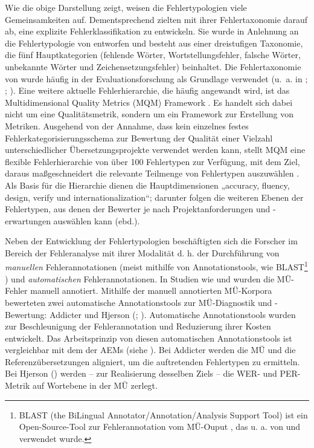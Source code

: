 Wie die obige Darstellung zeigt, weisen die Fehlertypologien viele Gemeinsamkeiten auf. Dementsprechend zielten \citet{VilarEtAl2006} mit ihrer Fehlertaxonomie darauf ab, eine explizite Fehlerklassifikation zu entwickeln. Sie wurde in Anlehnung an die Fehlertypologie von \citet{LlitjósEtAl2005} entworfen und besteht aus einer dreistufigen Taxonomie, die fünf Hauptkategorien (fehlende Wörter, Wortstellungsfehler, falsche Wörter, unbekannte Wörter und Zeichensetzungsfehler) beinhaltet. Die Fehlertaxonomie von \citet{VilarEtAl2006} wurde häufig in der Evaluationsforschung als Grundlage verwendet (u.~a. in \citealt{AvramidisKöhn2008}; \citealt{Bojar2011}; \citealt{PopovićBurchardt2011}). Eine weitere aktuelle Fehlerhierarchie, die häufig angewandt wird, ist das Multidimensional Quality Metrics (MQM) Framework \citep{LommelEtAl2013}. Es handelt sich dabei nicht um eine Qualitätsmetrik, sondern um ein Framework zur Erstellung von Metriken. Ausgehend von der Annahme, dass kein einzelnes festes Fehlerkategorisierungsschema zur Bewertung der Qualität einer Vielzahl unterschiedlicher Übersetzungsprojekte verwendet werden kann, stellt MQM eine flexible Fehlerhierarchie von über 100 Fehlertypen zur Verfügung, mit dem Ziel, daraus maßgeschneidert die relevante Teilmenge von Fehlertypen auszuwählen \citep{LommelEtAl2013}. Als Basis für die Hierarchie dienen die Hauptdimensionen „accuracy, fluency, design, verify und internationalization“; darunter folgen die weiteren Ebenen der Fehlertypen, aus denen der Bewerter je nach Projektanforderungen und \nobreakdash-erwartungen auswählen kann (ebd.).

Neben der Entwicklung der Fehlertypologien beschäftigten sich die Forscher im Bereich der Fehleranalyse mit ihrer Modalität d. h. der Durchführung von \textit{manuellen} Fehlerannotationen (meist mithilfe von Annotationstools, wie BLAST\footnote{\textrm{BLAST (the BiLingual Annotator/Annotation/Analysis Support Tool) ist ein Open-Source-Tool zur Fehlerannotation vom MÜ-Ouput \citep{Stymne2011}, das u. a. von \citet{Flanagan1994} und \citet{VilarEtAl2006} verwendet wurde.}} \citep{Stymne2011}) und \textit{automatischen} Fehlerannotationen. In Studien wie \citet{FishelEtAl2012} und \citet{ElliottEtAl2004} wurden die MÜ-Fehler manuell annotiert. Mithilfe der manuell annotierten MÜ-Korpora bewerteten \citet{FishelEtAl2012} zwei automatische Annotationstools zur MÜ-Diagnostik und -Bewertung: Addicter \citep{ZemanEtAl2011} und Hjerson (\citealt{Popović2011}; \citealt{PopovićNey2011}). Automatische Annotationstools wurden zur Beschleunigung der Fehlerannotation und Reduzierung ihrer Kosten entwickelt. Das Arbeitsprinzip von diesen automatischen Annotationstools ist vergleichbar mit dem der AEMs (siehe ). Bei Addicter \citep{ZemanEtAl2011} werden die MÜ und die Referenzübersetzungen aligniert, um die auftretenden Fehlertypen zu ermitteln. Bei Hjerson (\citealt{PopovićNey2011}) werden -- zur Realisierung desselben Ziels -- die WER- und PER-Metrik auf Wortebene in der MÜ zerlegt.

